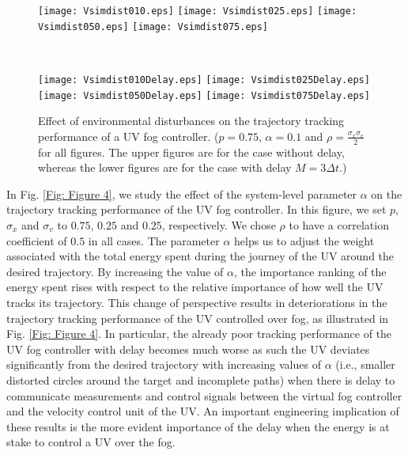 \documentclass[10pt, journal, letterpaper]{IEEEtran}
\newcommand{\1}{\ensuremath{\mathbf{1}}} %
\begin{document}
\begin{figure*}[!t]
\begin{minipage}[t]{20cm}
\begin{center}
\hspace{-1.75cm}
\texttt{[image: Vsimdist010.eps]}
%
\hspace{-0.5cm}
%
\texttt{[image: Vsimdist025.eps]}
%
\hspace{-0.5cm}
%
\texttt{[image: Vsimdist050.eps]}
%
\hspace{-0.5cm}
%
\texttt{[image: Vsimdist075.eps]}
\end{center}
\end{minipage}
%
\\
%
\begin{minipage}[t]{20cm}
\begin{center}
\hspace{-1.75cm}
\texttt{[image: Vsimdist010Delay.eps]}
%
\hspace{-0.5cm}
%
\texttt{[image: Vsimdist025Delay.eps]}
%
\hspace{-0.5cm}
%
\texttt{[image: Vsimdist050Delay.eps]}
%
\hspace{-0.5cm}
%
\texttt{[image: Vsimdist075Delay.eps]}
\end{center}
\end{minipage}
\caption{Effect of environmental disturbances on the trajectory tracking performance of a UV fog controller. ($p = 0.75$, $\alpha = 0.1$ and $\rho = \frac{\sigma_x \sigma_v}{2}$ for all figures. The upper figures are for the case without delay, whereas the lower figures are for the case with delay $M = 3 \Delta t$.)}  \label{Fig: Figure 3}
\end{figure*}

In Fig. \ref{Fig: Figure 4}, we study the effect of the system-level parameter $\alpha$ on the trajectory tracking performance of the UV fog controller.  In this figure, we set $p$, $\sigma_x$ and $\sigma_v$ to $0.75$, $0.25$ and $0.25$, respectively.  We chose $\rho$ to have a correlation coefficient of $0.5$ in all cases.  The parameter $\alpha$ helps us to adjust the weight associated with the total energy spent during the journey of the UV around the desired trajectory. By increasing the value of $\alpha$, the importance ranking of the energy spent rises with respect to the relative importance of how well the UV tracks its trajectory.  This change of perspective results in deteriorations in the trajectory tracking performance of the UV controlled over fog, as illustrated in Fig. \ref{Fig: Figure 4}.  In particular, the already poor tracking performance of the UV fog controller with delay becomes much worse as such the UV deviates significantly from the desired trajectory with increasing values of $\alpha$ (i.e., smaller distorted circles around the target and incomplete paths) when there is delay to communicate measurements and control signals between the virtual fog controller and the velocity control unit of the UV.  An important engineering implication of these results is the more evident importance of the delay when the energy is at stake to control a UV over the fog.
\end{document}
